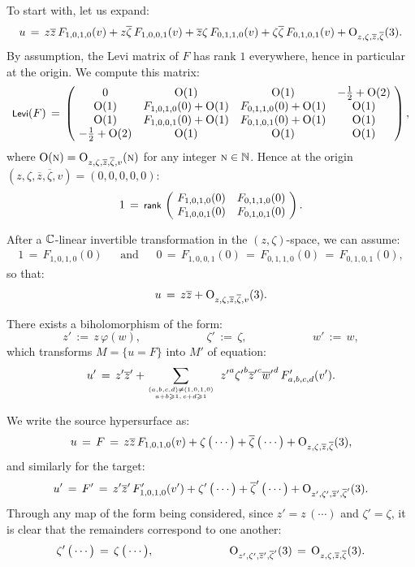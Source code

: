 \documentclass[12pt,twoside,leqno,openany]{amsart}
\begin{document}
To start with, let us expand:
\[
u
\,=\,
z\overline{z}\,
F_{1,0,1,0}(v)
+
z\overline{\zeta}\,
F_{1,0,0,1}(v)
+
\overline{z}\zeta\,
F_{0,1,1,0}(v)
+
\zeta\overline{\zeta}\,
F_{0,1,0,1}(v)
+
{\rm O}_{z,\zeta,\overline{z},\overline{\zeta}}(3).
\]
By assumption, the Levi
matrix of $F$ has rank $1$ everywhere,
hence in particular at the origin.
We compute this matrix:
\[
\text{\footnotesize{\sf Levi}}(F)
\,=\,
\left(\!
\begin{array}{cccc}
0 & {\rm O}(1) & {\rm O}(1) & -\frac{1}{2}+{\rm O}(2)
\\
{\rm O}(1) & F_{1,0,1,0}(0)+{\rm O}(1) & 
F_{0,1,1,0}(0)+{\rm O}(1) & {\rm O}(1)
\\
{\rm O}(1) & F_{1,0,0,1}(0)+{\rm O}(1) &
F_{0,1,0,1}(0)+{\rm O}(1) & {\rm O}(1)
\\
-\frac{1}{2}+{\rm O}(2) & {\rm O}(1) & {\rm O}(1) & {\rm O}(1)
\end{array}
\!\right),
\]
where ${\rm O}(\text{\sc n}) = {\rm O}_{z,\zeta, \overline{z}, 
\overline{\zeta}, v}(\text{\sc n})$ for any integer $\text{\sc n} \in \mathbb{N}$.
Hence at the origin $(z, \zeta, \overline{z}, \overline{\zeta}, v)
= (0, 0, 0, 0, 0)$:
\[
1
\,=\,
\text{\footnotesize{\sf rank}}\,
\left(\!
\begin{array}{cc}
F_{1,0,1,0}(0) & F_{0,1,1,0}(0)
\\
F_{1,0,0,1}(0) & F_{0,1,0,1}(0)
\end{array}
\!\right).
\]

After a $\mathbb{C}$-linear invertible transformation in the
$(z, \zeta)$-space, we can assume:
\leqnomode{}
\begin{align}
\label{1-rank-origin-Levi-form}
1
\,=\,
F_{1,0,1,0}(0)
\ \ \ \ \ \ \
\text{and}
\ \ \ \ \ \ \
0
\,=\,
F_{1,0,0,1}(0)
\,=\,
F_{0,1,1,0}(0)
\,=\,
F_{0,1,0,1}(0),
\end{align}
so that:
\[
u
\,=\,
z\overline{z}
+
{\rm O}_{z,\zeta,\overline{z},\overline{\zeta},v}(3).
\]

\begin{Lemma}
There exists a biholomorphism of the form:
\[
z'
\,:=\,
z\,\varphi(w),
\ \ \ \ \ \ \ \ \ \ \ \ \ \ \ \ \ \ \ \ \ \ \ \ \ \
\zeta'
\,:=\,
\zeta,
\ \ \ \ \ \ \ \ \ \ \ \ \ \ \ \ \ \ \ \ \ \ \ \ \ \
w'
\,:=\,
w,
\]
which transforms $M = \{u = F\}$ into $M'$ of equation:
\[
u'
\,=\,
z'\overline{z}'
+
\sum_{(a,b,c,d)\neq(1,0,1,0)
\atop
a+b\geqslant1,\,
c+d\geqslant 1}\,\,
{z'}^a{\zeta'}^b{\overline{z}'}^c{\overline{w}'}^d\,
F_{a,b,c,d}'(v').
\]
\end{Lemma}

\proof
We write the source hypersurface as:
\[
u
\,=\,
F
\,=\,
z\overline{z}\,F_{1,0,1,0}(v)
+
\zeta\,\big(\cdots\big)
+
\overline{\zeta}\,\big(\cdots\big)
+
{\rm O}_{z,\zeta,\overline{z},\overline{\zeta}}(3),
\]
and similarly for the target:
\[
u'
\,=\,
F'
\,=\,
{z'}{\overline{z}'}\,
F_{1,0,1,0}'(v')
+
\zeta'\,\big(\cdots\big)
+
\overline{\zeta}'\,\big(\cdots\big)
+
{\rm O}_{z',\zeta',\overline{z}',\overline{\zeta}'}(3).
\]
Through any map of the form being considered, since $z' = z\,
(\cdots)$ and $\zeta' = \zeta$, 
it is clear that the remainders correspond to one another:
\[
\zeta'\,\big(\cdots\big)
\,=\,
\zeta\,\big(\cdots\big),
\ \ \ \ \ \ \ \ \ \ \ \ \ \ \ \ \ \ \ \
{\rm O}_{z',\zeta',\overline{z}',\overline{\zeta}'}(3)
\,=\,
{\rm O}_{z,\zeta,\overline{z},\overline{\zeta}}(3).
\]
\end{document}
